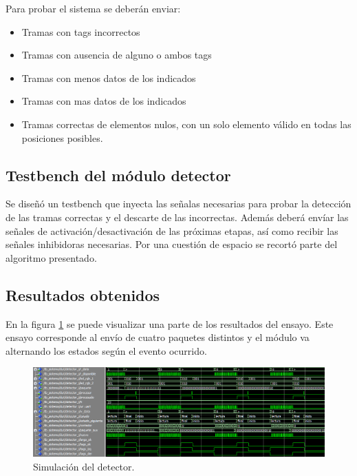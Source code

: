 	Para probar el sistema se deberán enviar:
	
	\begin{itemize}
		\item Tramas con tags incorrectos
		\item Tramas con ausencia de alguno o ambos tags
		\item Tramas con menos datos de los indicados
		\item Tramas con mas datos de los indicados
		\item Tramas correctas de elementos nulos, con un solo elemento válido en todas las posiciones posibles.
	\end{itemize}
	
	\subsection{Testbench del módulo detector}
			
		Se diseñó un testbench que inyecta las señalas necesarias para probar la detección de las tramas correctas y el descarte de las incorrectas. Además deberá envíar las señales de activación/desactivación de las próximas etapas, así como recibir las señales inhibidoras necesarias. Por una cuestión de espacio se recortó parte del algoritmo presentado.		
						
	\subsection{Resultados obtenidos}
				
		En la figura \ref{fig:Test_Detector} se puede visualizar una parte de los resultados del ensayo. Este ensayo corresponde al envío de cuatro paquetes distintos y el módulo va alternando los estados según el evento ocurrido. 
		
		\begin{figure}[h]
		\centering
		\includegraphics[scale=0.5]{./Figures/Test/Detector}
			\caption{Simulación del detector.}
			\label{fig:Test_Detector}
		\end{figure}

